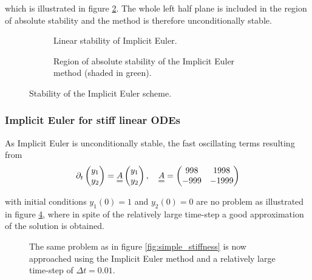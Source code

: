 which is illustrated in figure \ref{fig:imp_eul_stab_reg}. The whole left half plane is included in the region of absolute stability and the method is therefore unconditionally stable.

\begin{figure}
  \centering
  \begin{subfigure}{.5\textwidth}
    \centering
    
    \caption[width=.92\linewidth]{Linear stability of Implicit Euler.}
    \label{fig:imp_eul_lin_stab}
  \end{subfigure}%
  \begin{subfigure}{.5\textwidth}
    \centering
    
    \caption[width=.92\linewidth]{Region of absolute stability of the Implicit Euler method (shaded in green).}
    \label{fig:imp_eul_stab_reg}
  \end{subfigure}
  \caption{Stability of the Implicit Euler scheme.}
  \label{fig:imp_eul_total}
\end{figure}

\subsubsection{Implicit Euler for stiff linear ODEs}
\label{sssec:implicit_euler_linear}
As Implicit Euler is unconditionally stable, the fast oscillating terms resulting from
\[
  \partial_t \begin{pmatrix} y_1 \\ y_2 \end{pmatrix} = \mat{A} \begin{pmatrix} y_1 \\ y_2 \end{pmatrix}, \quad \mat{A} = \begin{pmatrix} 998 & 1998 \\ -999 & -1999 \end{pmatrix}
\]

with initial conditions $y_1(0) = 1$ and $y_2(0) = 0$ are no problem as illustrated in figure \ref{fig:simple_stiffness_impl}, where in spite of the relatively large time-step a good approximation of the solution is obtained.

\begin{figure}[!htb]
  \centering
  \hfill
  \caption{The same problem as in figure \ref{fig:simple_stiffness} is now approached using the Implicit Euler method and a relatively large time-step of $\Delta t = 0.01$.}
  \label{fig:simple_stiffness_impl}
\end{figure}

